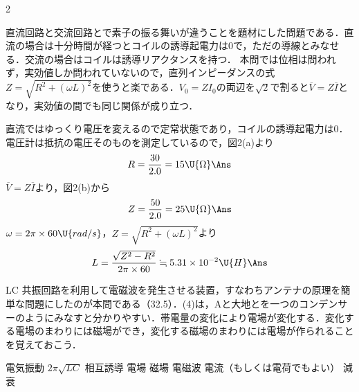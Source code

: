 \begin{multicols}{2}
\par\nopagebreak
\begin{sisin}
直流回路と交流回路とで素子の振る舞いが違うことを題材にした問題である．直流の場合は十分時間が経つとコイルの誘導起電力は$0$で，ただの導線とみなせる．交流の場合はコイルは誘導リアクタンスを持つ．
本問では位相は問われず，実効値しか問われていないので，直列インピーダンスの式$Z=\sqrt{R^2+(\omega L)^2}$を使うと楽である．$V_0=ZI_0$の両辺を$\sqrt{2}$で割ると$\overline{V}=Z\overline{I}$となり，実効値の間でも同じ関係が成り立つ．
\end{sisin}
\KaiHead
\begin{komon}
 直流ではゆっくり電圧を変えるので定常状態であり，コイルの誘導起電力は$0$．電圧計は抵抗の電圧そのものを測定しているので，図2(a)より
       \[R=\frac{30}{2.0}=15\U{\Omega}\Ans\]
 $\overline{V}=Z\overline{I}$より，図2(b)から
       \[Z=\frac{50}{2.0}=25\U{\Omega}\Ans\]
 $\omega=2\pi\times 60\U{rad/s}$，$Z=\sqrt{R^2+(\omega L)^2}$より
       \[L=\frac{\sqrt{Z^2-R^2}}{2\pi\times 60}\fallingdotseq 5.31\times 10^{-2}\U{H}\Ans\]
\end{komon}

\par\nopagebreak
\begin{sisin}
LC 共振回路を利用して電磁波を発生させる装置，すなわちアンテナの原理を簡単な問題にしたのが本問である（32.5）．(4)は，Aと大地とを一つのコンデンサーのようにみなすと分かりやすい．帯電量の変化により電場が変化する．変化する電場のまわりには磁場ができ，変化する磁場のまわりには電場が作られることを覚えておこう．
\end{sisin}
\KaiHead
\begin{komon}
 電気振動\Ans
{} $2\pi\sqrt{LC}$\Ans
{} 相互誘導\Ans
{} 電場\Ans
{} 磁場\Ans
{} 電磁波\Ans
{} 電流（もしくは電荷でもよい）\Ans
{} 減衰\Ans
\end{komon}


\end{multicols}
